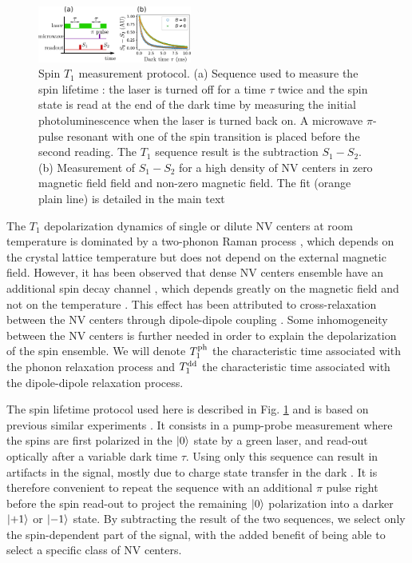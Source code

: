 \documentclass[preprintnumbers,amsmath,amssymb,superscriptaddress,twocolumn,showpacs]{revtex4-2}
\begin{document}
\begin{figure}
\includegraphics[width=0.45\textwidth]{Figures/fig T1}
\caption{Spin $T_1$ measurement protocol. (a) Sequence used to measure the spin lifetime : the laser is turned off for a time $\tau$ twice and the spin state is read at the end of the dark time by measuring the initial photoluminescence when the laser is turned back on. A microwave $\pi$-pulse resonant with one of the spin transition is placed before the second reading. The  $T_1$ sequence result is the subtraction $S_1-S_2$. (b) Measurement of $S_1-S_2$ for a high density of NV centers in zero magnetic field field and non-zero magnetic field. The fit (orange plain line) is detailed in the main text}
\label{T1}
\end{figure}

The $T_1$ depolarization dynamics of single or dilute NV centers at room temperature is dominated by a two-phonon Raman process \citep{redman1991spin,jarmola_temperature-_2012,norambuena2018spin}, which depends on the crystal lattice temperature but does not depend on the external magnetic field. However, it has been observed that dense NV centers ensemble have an additional spin decay channel \citep{jarmola_temperature-_2012,jarmola_longitudinal_2015,mrozek_longitudinal_2015, choi_depolarization_2017, akhmedzhanov_microwave-free_2017, akhmedzhanov_magnetometry_2019, pellet2021magnetic, mrozek2021characterization}, which depends greatly on the magnetic field and not on the temperature . This effect has been attributed to cross-relaxation between the NV centers through dipole-dipole coupling \citep{mrozek_longitudinal_2015, choi_depolarization_2017}. Some inhomogeneity between the NV centers is further needed in order to explain the depolarization of the spin ensemble. We will denote $T_1^{\rm ph}$ the characteristic time associated with the phonon relaxation process and $T_1^{\rm dd}$ the characteristic time associated with the dipole-dipole relaxation process.

The spin lifetime protocol used here is described in Fig. \ref{T1} and is based on previous similar experiments \citep{jarmola_temperature-_2012, mrozek_longitudinal_2015, choi_depolarization_2017}. It consists in a pump-probe measurement where the spins are first polarized in the $\ket{0}$ state by a green laser, and read-out optically after a variable dark time $\tau$. Using only this sequence can result in artifacts in the signal, mostly due to charge state transfer in the dark \citep{giri_coupled_2018, giri_selective_2019}. It is therefore convenient to repeat the sequence with an additional $\pi$ pulse right before the spin read-out to project the remaining $\ket{0}$ polarization into a darker $\ket{+1}$ or $\ket{-1}$ state. By subtracting the result of the two sequences, we select only the spin-dependent part of the signal, with the added benefit of being able to select a specific class of NV centers. 
\end{document}
